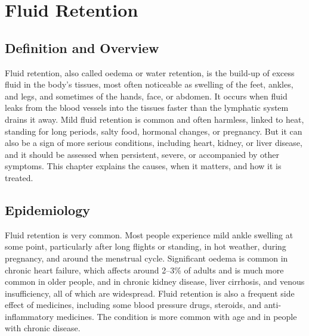 \chapter{Fluid Retention}

\section*{Definition and Overview}
Fluid retention, also called oedema or water retention, is the build-up of excess fluid in the body's tissues, most often noticeable as swelling of the feet, ankles, and legs, and sometimes of the hands, face, or abdomen. It occurs when fluid leaks from the blood vessels into the tissues faster than the lymphatic system drains it away. Mild fluid retention is common and often harmless, linked to heat, standing for long periods, salty food, hormonal changes, or pregnancy. But it can also be a sign of more serious conditions, including heart, kidney, or liver disease, and it should be assessed when persistent, severe, or accompanied by other symptoms. This chapter explains the causes, when it matters, and how it is treated.

\section*{Epidemiology}
Fluid retention is very common. Most people experience mild ankle swelling at some point, particularly after long flights or standing, in hot weather, during pregnancy, and around the menstrual cycle. Significant oedema is common in chronic heart failure, which affects around 2--3\% of adults and is much more common in older people, and in chronic kidney disease, liver cirrhosis, and venous insufficiency, all of which are widespread. Fluid retention is also a frequent side effect of medicines, including some blood pressure drugs, steroids, and anti-inflammatory medicines. The condition is more common with age and in people with chronic disease.

